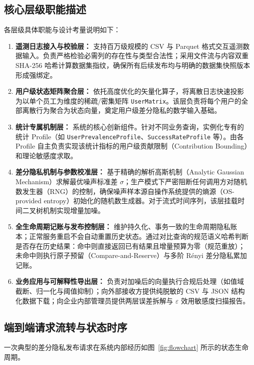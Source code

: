 \subsection{核心层级职能描述}
各层级具体职能与设计考量说明如下：
\begin{enumerate}[label=\textbf{\arabic*.}, leftmargin=2em]
  \item \textbf{遥测日志接入与校验层：} 支持百万级规模的 CSV 与 Parquet 格式交互遥测数据输入。负责严格检验必需列的存在性与类型合法性；采用文件流与内容双重 SHA-256 哈希计算数据集指纹，确保所有后续发布均与明确的数据集快照版本形成强绑定。
  \item \textbf{用户级状态矩阵聚合层：} 依托高度优化的矢量化算子，将离散日志快速投影为以单个员工为维度的稀疏/密集矩阵 \texttt{UserMatrix}。该层负责将每个用户的全部离散行为聚合为状态向量，奠定用户级差分隐私的数学输入基础。
  \item \textbf{统计专属机制层：} 系统的核心创新组件。针对不同业务查询，实例化专有的统计 Profile（如 \texttt{UserPrevalenceProfile}、\texttt{SuccessRateProfile} 等）。由各 Profile 自主负责实现该统计指标的用户级贡献限制（Contribution Bounding）和理论敏感度求取。
  \item \textbf{差分隐私机制与参数校准层：} 基于精确的解析高斯机制（Analytic Gaussian Mechanism）求解最优噪声标准差 $\sigma$；生产模式下严密阻断任何调用方对随机数发生器（RNG）的控制，确保噪声样本源自操作系统提供的熵源（OS-provided entropy）初始化的随机数生成器。对于流式时间序列，该层挂载时间二叉树机制实现增量加噪。
  \item \textbf{全生命周期记账与发布控制层：} 维护持久化、事务一致的生命周期隐私账本；正常服务重启不会自动重置历史状态。通过对比查询的规范语义哈希判断是否存在历史结果：命中则直接返回已有结果且增量预算为零（规范重放）；未命中则执行原子预留（Compare-and-Reserve）与多阶 Rényi 差分隐私累加记账。
  \item \textbf{业务应用与可解释性导出层：} 负责对加噪后的向量执行合规后处理（如值域截断、归一化与阈值抑制）；向外部接收方提供纯脱敏的 CSV 与 JSON 结构化数据下载；向企业内部管理员提供两层误差拆解与 $\varepsilon$ 效用敏感度扫描报告。
\end{enumerate}

\subsection{端到端请求流转与状态时序}
一次典型的差分隐私发布请求在系统内部经历如图~\ref{fig:flowchart} 所示的状态生命周期。

